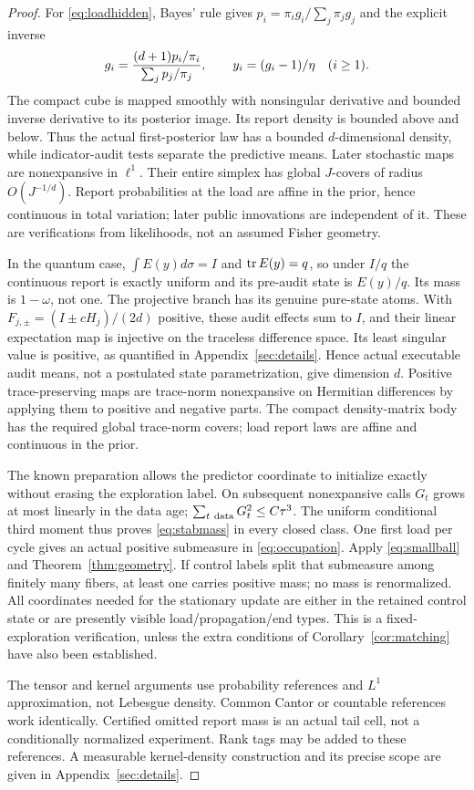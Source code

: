 \begin{proof}
For \eqref{eq:loadhidden}, Bayes' rule gives $p_i=\pi_i g_i/\sum_j\pi_jg_j$ and the explicit inverse
\[
 g_i={(d+1)p_i/\pi_i\over\sum_jp_j/\pi_j},\qquad y_i=(g_i-1)/\eta\quad(i\ge1).
\]
The compact cube is mapped smoothly with nonsingular derivative and bounded inverse derivative to its posterior image. Its report density is bounded above and below. Thus the actual first-posterior law has a bounded $d$-dimensional density, while indicator-audit tests separate the predictive means. Later stochastic maps are nonexpansive in $\ell^1$. Their entire simplex has global $J$-covers of radius $O(J^{-1/d})$. Report probabilities at the load are affine in the prior, hence continuous in total variation; later public innovations are independent of it. These are verifications from likelihoods, not an assumed Fisher geometry.

In the quantum case, $\int E(y)d\sigma=I$ and $\operatorname{tr} E(y)=q$, so under $I/q$ the continuous report is exactly uniform and its pre-audit state is $E(y)/q$. Its mass is $1-\omega$, not one. The projective branch has its genuine pure-state atoms. With
$F_{j,\pm}=(I\pm cH_j)/(2d)$ positive, these audit effects sum to $I$, and their linear expectation map is injective on the traceless difference space. Its least singular value is positive, as quantified in Appendix~\ref{sec:details}. Hence actual executable audit means, not a postulated state parametrization, give dimension $d$. Positive trace-preserving maps are trace-norm nonexpansive on Hermitian differences by applying them to positive and negative parts. The compact density-matrix body has the required global trace-norm covers; load report laws are affine and continuous in the prior.

The known preparation allows the predictor coordinate to initialize exactly without erasing the exploration label. On subsequent nonexpansive calls $G_t$ grows at most linearly in the data age; $\sum_{t\ {\rm data}}G_t^2\le C\tau^3$. The uniform conditional third moment thus proves \eqref{eq:stabmass} in every closed class. One first load per cycle gives an actual positive submeasure in \eqref{eq:occupation}. Apply \eqref{eq:smallball} and Theorem~\ref{thm:geometry}. If control labels split that submeasure among finitely many fibers, at least one carries positive mass; no mass is renormalized. All coordinates needed for the stationary update are either in the retained control state or are presently visible load/propagation/end types. This is a fixed-exploration verification, unless the extra conditions of Corollary~\ref{cor:matching} have also been established.

The tensor and kernel arguments use probability references and $L^1$ approximation, not Lebesgue density. Common Cantor or countable references work identically. Certified omitted report mass is an actual tail cell, not a conditionally normalized experiment. Rank tags may be added to these references. A measurable kernel-density construction and its precise scope are given in Appendix~\ref{sec:details}.
\end{proof}


